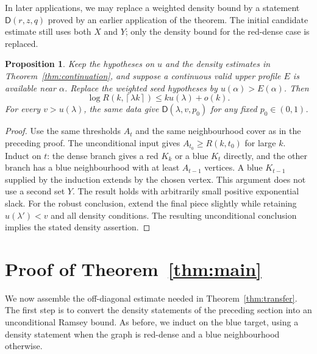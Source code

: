 \documentclass[11pt]{article}
\newtheorem{proposition}[theorem]{Proposition}
\theoremstyle{definition}
\theoremstyle{remark}
\newcommand{\D}{\mathsf D}
\newcommand{\ceil}[1]{\left\lceil #1\right\rceil}
\numberwithin{equation}{section}
\begin{document}
In later applications, we may replace a weighted density bound by a
statement $\D(r,z,q)$ proved by an earlier application of the theorem.
The initial candidate estimate still uses both $X$ and $Y$; only the density bound
for the red-dense case is replaced.

\begin{proposition}\label{prop:unconditional-start}
Keep the hypotheses on $u$ and the density estimates in
Theorem~\ref{thm:continuation}, and suppose a continuous valid upper
profile $E$ is available near $\alpha$. Replace the weighted seed
hypotheses by $u(\alpha)>E(\alpha)$. Then
\[
 \log R(k,\ceil{\lambda k})\le ku(\lambda)+o(k).
\]
For every $v>u(\lambda)$, the same data give $\D(\lambda,v,p_0)$ for any fixed $p_0\in(0,1)$.
\end{proposition}
\begin{proof}
Use the same thresholds $A_t$ and the same neighbourhood cover as in the preceding proof. The unconditional input gives $A_{t_0}\ge R(k,t_0)$ for large $k$. Induct on $t$: the dense branch gives a red $K_k$ or a blue $K_t$ directly, and the other branch has a blue neighbourhood with at least $A_{t-1}$ vertices. A blue $K_{t-1}$ supplied by the induction extends by the chosen
vertex. This argument does not use a second set $Y$. The result holds with arbitrarily small positive exponential slack. For the robust conclusion, extend the final piece slightly while retaining $u(\lambda')<v$ and all density conditions. The resulting unconditional conclusion implies the stated density assertion.
\end{proof}

\section{Proof of Theorem~\ref{thm:main}}\label{sec:certificate}

We now assemble the off-diagonal estimate needed in
Theorem~\ref{thm:transfer}. The first step is to convert the density
statements of the preceding section into an unconditional Ramsey
bound. As before, we induct on the blue target, using a density
statement when the graph is red-dense and a blue neighbourhood
otherwise.
\end{document}
